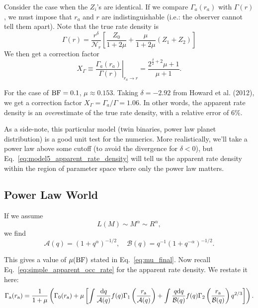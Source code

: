 \documentclass[12pt,modern]{aastex61}
\begin{document}
Consider the case when the $Z_i$'s are identical. If we compare 
$\Gamma_a(r_a)$ with $\Gamma(r)$, we must impose that $r_a$ and $r$ are 
indistinguishable (i.e.: the observer cannot tell them apart).
Note that the true rate density is
\begin{equation}
\Gamma(r) = \frac{r^\delta}{\mathcal{N}_r} \left[
\frac{Z_0}{1+2\mu} + \frac{\mu}{1+2\mu} (Z_1+Z_2)
\right]
\end{equation}
We then get a correction factor
\begin{equation}
X_\Gamma \equiv \left. \frac{\Gamma_a(r_a)}{\Gamma(r)} 
\right|_{r_a\rightarrow r}
=
\frac{2^{\frac{\delta}{2}+2}\mu + 1}{\mu + 1}.
\end{equation}

For the case of ${\rm BF}=0.1$, $\mu\approx 0.153$. Taking $\delta=-2.92$ from 
Howard et al. (2012),  we get a correction factor $X_\Gamma = 
\Gamma_a/\Gamma = 1.06$.
In other words, the apparent rate density is an {\it over}estimate of the true 
rate density, with a relative error of 6\%.

As a side-note, this particular model (twin binaries, power law planet 
distribution) is a good unit test for the numerics.
More realistically, we'll take a power law above some cutoff (to avoid the 
divergence for $\delta<0$), but Eq.~\ref{eq:model5_apparent_rate_density} will 
tell us the apparent rate density within the region of parameter space where 
only the power law matters.

\subsection{Power Law World}

If we assume 
\begin{equation}
	L(M) \sim M^\alpha \sim R^\alpha,
\end{equation}
we find 
\begin{equation}
\mathcal{A}(q)
=(1+q^\alpha)^{-1/2},
\quad
\mathcal{B}(q)
=q^{-1}(1+q^{-\alpha})^{-1/2}.
\end{equation}

This gives a value of $\mu({\rm BF})$ stated in Eq.~\ref{eq:mu_final}.
Now recall Eq.~\ref{eq:simple_apparent_occ_rate} for the apparent rate 
density. We restate it here:
\begin{equation}
\Gamma\a(r\a) = \frac{1}{1+\mu}
\left(
\Gamma_0(r\a) +
\mu \left[
\int \frac{{\rm d}q}{\mathcal{A}(q)} f(q) 
\Gamma_1\left( \frac{r\a}{\mathcal{A}(q)} \right)
+
\int \frac{q {\rm d}q}{\mathcal{B}(q)} f(q)
\Gamma_2\left(\frac{r\a}{\mathcal{B}(q)}\right) q^{2/3}
\right]
\right).
\end{equation}
\end{document}
